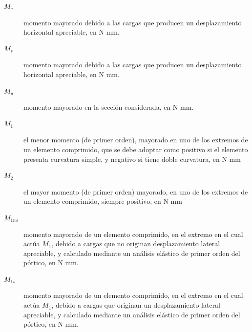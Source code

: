 \documentclass[twocolumn]{article}
\begin{document}
\begin{description}
	\item[$M_c$] momento mayorado debido a las cargas que producen un desplazamiento horizontal apreciable, en N mm.
	\item[$M_s$] momento mayorado debido a las cargas que producen un desplazamiento horizontal apreciable, en N mm.
	\item[$M_u$] momento mayorado en la sección considerada, en N mm.
	\item[$M_1$] el menor momento (de primer orden), mayorado en uno de los extremos de un elemento comprimido, que se debe adoptar como positivo si el elemento presenta curvatura simple, y negativo si tiene doble curvatura, en N mm
	\item[$M_2$] el mayor momento (de primer orden) mayorado, en uno de los extremos de un elemento comprimido, siempre positivo, en N mm
	\item[$M_{1ns}$] momento mayorado de un elemento comprimido, en el extremo en el cual actúa $M_1$, debido a cargas que no originan desplazamiento lateral apreciable, y calculado mediante un análisis elástico de primer orden del pórtico, en N mm.
	\item[$M_{1s}$] momento mayorado de un elemento comprimido, en el extremo en el cual actúa $M_1$, debido a cargas que originan un desplazamiento lateral apreciable, y calculado mediante un análisis elástico de primer orden del pórtico, en N mm.
	

\end{description}
\end{document}
